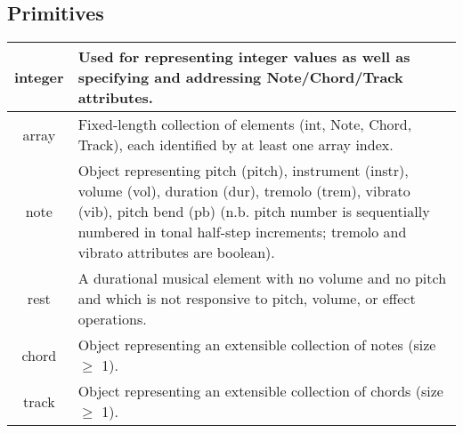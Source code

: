 \documentclass[letterpaper]{article}
\begin{document}
\begin{samepage}
\subsection{Primitives}
\begin{table}[H]
\centering
\begin{tabularx}{.75\textwidth}{|c|X|}
\hline
integer & Used for representing integer values as well as specifying and addressing Note/Chord/Track attributes. \\
\hline
array & Fixed-length collection of elements (int, Note, Chord, Track), each identified by at least one array index. \\
\hline
note & Object representing pitch (pitch), instrument (instr), volume (vol), duration (dur), tremolo (trem), vibrato (vib), pitch bend (pb) (n.b. pitch number is sequentially numbered in tonal half-step increments; tremolo and vibrato attributes are boolean). \\
\hline
rest & A durational musical element with no volume and no pitch and which is not responsive to pitch, volume, or effect operations. \\
\hline
chord & Object representing an extensible collection of notes (size $\geq$ 1). \\
\hline
track & Object representing an extensible collection of chords (size $\geq$ 1). \\
\hline
\end{tabularx}
\end{table}
\end{samepage}
\end{document}
